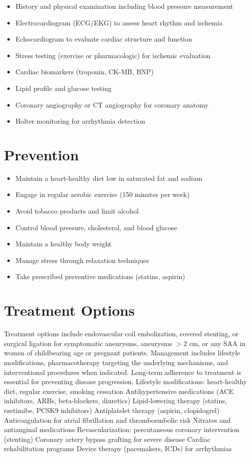 \begin{itemize}[noitemsep]
  \item History and physical examination including blood pressure measurement
  \item Electrocardiogram (ECG/EKG) to assess heart rhythm and ischemia
  \item Echocardiogram to evaluate cardiac structure and function
  \item Stress testing (exercise or pharmacologic) for ischemic evaluation
  \item Cardiac biomarkers (troponin, CK-MB, BNP)
  \item Lipid profile and glucose testing
  \item Coronary angiography or CT angiography for coronary anatomy
  \item Holter monitoring for arrhythmia detection
\end{itemize}
\section{Prevention}
\begin{itemize}[noitemsep]
  \item Maintain a heart-healthy diet low in saturated fat and sodium
  \item Engage in regular aerobic exercise (150 minutes per week)
  \item Avoid tobacco products and limit alcohol
  \item Control blood pressure, cholesterol, and blood glucose
  \item Maintain a healthy body weight
  \item Manage stress through relaxation techniques
  \item Take prescribed preventive medications (statins, aspirin)
\end{itemize}
\section{Treatment Options}
Treatment options include endovascular coil embolization, covered stenting, or surgical ligation for symptomatic aneurysms, aneurysms $>2$ cm, or any SAA in women of childbearing age or pregnant patients. Management includes lifestyle modifications, pharmacotherapy targeting the underlying mechanisms, and interventional procedures when indicated. Long-term adherence to treatment is essential for preventing disease progression. Lifestyle modifications: heart-healthy diet, regular exercise, smoking cessation Antihypertensive medications (ACE inhibitors, ARBs, beta-blockers, diuretics) Lipid-lowering therapy (statins, ezetimibe, PCSK9 inhibitors) Antiplatelet therapy (aspirin, clopidogrel) Anticoagulation for atrial fibrillation and thromboembolic risk Nitrates and antianginal medications Revascularization: percutaneous coronary intervention (stenting) Coronary artery bypass grafting for severe disease Cardiac rehabilitation programs Device therapy (pacemakers, ICDs) for arrhythmias

